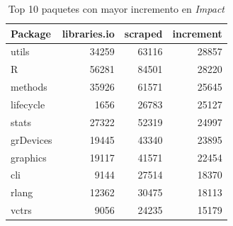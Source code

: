 \begin{table}[h!]
    \begin{center}
        \begin{tabular}{|l|r|r|r|}
            \hline
            \textbf{Package} & \textbf{libraries.io} & \textbf{scraped} & \textbf{increment} \\
            \hline
            utils            & 34259                 & 63116            & 28857              \\
            R                & 56281                 & 84501            & 28220              \\
            methods          & 35926                 & 61571            & 25645              \\
            lifecycle        & 1656                  & 26783            & 25127              \\
            stats            & 27322                 & 52319            & 24997              \\
            grDevices        & 19445                 & 43340            & 23895              \\
            graphics         & 19117                 & 41571            & 22454              \\
            cli              & 9144                  & 27514            & 18370              \\
            rlang            & 12362                 & 30475            & 18113              \\
            vctrs            & 9056                  & 24235            & 15179              \\
            \hline
        \end{tabular}
        \caption{Top 10 paquetes con mayor incremento en \textit{Impact}}
        \label{tab:Top 10 paquetes con mayor incremento en Impact}
    \end{center}
\end{table}

